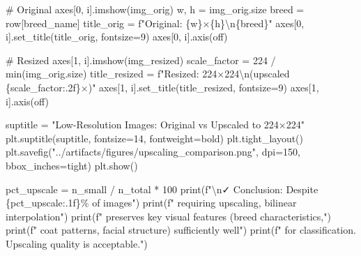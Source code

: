 \documentclass[
  letterpaper,
  DIV=11,
  numbers=noendperiod]{scrartcl}
\newenvironment{Shaded}{\begin{snugshade}}{\end{snugshade}}
\newcommand{\BuiltInTok}[1]{\textcolor[rgb]{0.00,0.23,0.31}{#1}}
\newcommand{\CharTok}[1]{\textcolor[rgb]{0.13,0.47,0.30}{#1}}
\newcommand{\CommentTok}[1]{\textcolor[rgb]{0.37,0.37,0.37}{#1}}
\newcommand{\DecValTok}[1]{\textcolor[rgb]{0.68,0.00,0.00}{#1}}
\newcommand{\NormalTok}[1]{\textcolor[rgb]{0.00,0.23,0.31}{#1}}
\newcommand{\OperatorTok}[1]{\textcolor[rgb]{0.37,0.37,0.37}{#1}}
\newcommand{\SpecialCharTok}[1]{\textcolor[rgb]{0.37,0.37,0.37}{#1}}
\newcommand{\SpecialStringTok}[1]{\textcolor[rgb]{0.13,0.47,0.30}{#1}}
\newcommand{\StringTok}[1]{\textcolor[rgb]{0.13,0.47,0.30}{#1}}
\renewenvironment{Shaded}{%
  \begin{tcolorbox}[%
    enhanced,%
    colback=codebg,%
    colframe=codebg,%
    borderline west={3pt}{0pt}{sectionblue},%
    boxrule=0pt,%
    arc=0pt,%
    boxsep=5pt,%
    left=2mm,%
    right=2mm,%
    top=2mm,%
    bottom=2mm%
  ]%
}{%
  \end{tcolorbox}%
}
\begin{document}
\begin{Shaded}
\begin{Highlighting}[]
    \CommentTok{\# Original}
\NormalTok{    axes[}\DecValTok{0}\NormalTok{, i].imshow(img\_orig)}
\NormalTok{    w, h }\OperatorTok{=}\NormalTok{ img\_orig.size}
\NormalTok{    breed }\OperatorTok{=}\NormalTok{ row[}\StringTok{\textquotesingle{}breed\_name\textquotesingle{}}\NormalTok{]}
\NormalTok{    title\_orig }\OperatorTok{=} \SpecialStringTok{f"Original: }\SpecialCharTok{\{}\NormalTok{w}\SpecialCharTok{\}}\SpecialStringTok{×}\SpecialCharTok{\{}\NormalTok{h}\SpecialCharTok{\}}\CharTok{\textbackslash{}n}\SpecialCharTok{\{}\NormalTok{breed}\SpecialCharTok{\}}\SpecialStringTok{"}
\NormalTok{    axes[}\DecValTok{0}\NormalTok{, i].set\_title(title\_orig, fontsize}\OperatorTok{=}\DecValTok{9}\NormalTok{)}
\NormalTok{    axes[}\DecValTok{0}\NormalTok{, i].axis(}\StringTok{\textquotesingle{}off\textquotesingle{}}\NormalTok{)}
    
    \CommentTok{\# Resized}
\NormalTok{    axes[}\DecValTok{1}\NormalTok{, i].imshow(img\_resized)}
\NormalTok{    scale\_factor }\OperatorTok{=} \DecValTok{224} \OperatorTok{/} \BuiltInTok{min}\NormalTok{(img\_orig.size)}
\NormalTok{    title\_resized }\OperatorTok{=} \SpecialStringTok{f"Resized: 224×224}\CharTok{\textbackslash{}n}\SpecialStringTok{(upscaled }\SpecialCharTok{\{}\NormalTok{scale\_factor}\SpecialCharTok{:.2f\}}\SpecialStringTok{×)"}
\NormalTok{    axes[}\DecValTok{1}\NormalTok{, i].set\_title(title\_resized, fontsize}\OperatorTok{=}\DecValTok{9}\NormalTok{)}
\NormalTok{    axes[}\DecValTok{1}\NormalTok{, i].axis(}\StringTok{\textquotesingle{}off\textquotesingle{}}\NormalTok{)}

\NormalTok{suptitle }\OperatorTok{=} \StringTok{"Low{-}Resolution Images: Original vs Upscaled to 224×224"}
\NormalTok{plt.suptitle(suptitle, fontsize}\OperatorTok{=}\DecValTok{14}\NormalTok{, fontweight}\OperatorTok{=}\StringTok{\textquotesingle{}bold\textquotesingle{}}\NormalTok{)}
\NormalTok{plt.tight\_layout()}
\NormalTok{plt.savefig(}\StringTok{"../artifacts/figures/upscaling\_comparison.png"}\NormalTok{, }
\NormalTok{            dpi}\OperatorTok{=}\DecValTok{150}\NormalTok{, bbox\_inches}\OperatorTok{=}\StringTok{\textquotesingle{}tight\textquotesingle{}}\NormalTok{)}
\NormalTok{plt.show()}

\NormalTok{pct\_upscale }\OperatorTok{=}\NormalTok{ n\_small }\OperatorTok{/}\NormalTok{ n\_total }\OperatorTok{*} \DecValTok{100}
\BuiltInTok{print}\NormalTok{(}\SpecialStringTok{f"}\CharTok{\textbackslash{}n}\SpecialStringTok{✓ Conclusion: Despite }\SpecialCharTok{\{}\NormalTok{pct\_upscale}\SpecialCharTok{:.1f\}}\SpecialStringTok{\% of images"}\NormalTok{)}
\BuiltInTok{print}\NormalTok{(}\SpecialStringTok{f"  requiring upscaling, bilinear interpolation"}\NormalTok{)}
\BuiltInTok{print}\NormalTok{(}\SpecialStringTok{f"  preserves key visual features (breed characteristics,"}\NormalTok{)}
\BuiltInTok{print}\NormalTok{(}\SpecialStringTok{f"  coat patterns, facial structure) sufficiently well"}\NormalTok{)}
\BuiltInTok{print}\NormalTok{(}\SpecialStringTok{f"  for classification. Upscaling quality is acceptable."}\NormalTok{)}
\end{Highlighting}
\end{Shaded}
\end{document}
